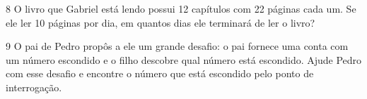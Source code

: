 \pagebreak
\num{8} O livro que Gabriel está lendo possui 12 capítulos com 22 páginas cada
um. Se ele ler 10 páginas por dia, em quantos dias ele terminará de ler
o livro?


\num{9} O pai de Pedro propôs a ele um grande desafio:
o pai fornece uma conta com um número escondido e o filho 
descobre qual número está escondido. Ajude Pedro com esse desafio e
encontre o número que está escondido pelo ponto de interrogação.

